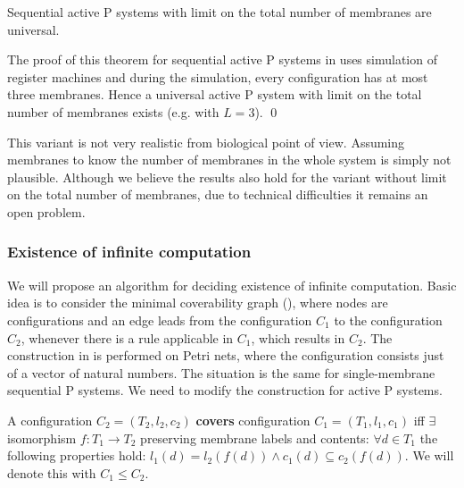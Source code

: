 \begin{veta}
  Sequential active P systems with limit on the total number of membranes are universal.
\end{veta}

\begin{dokaz}
  The proof of this theorem for sequential active P systems in \cite{Ibarra05Active} uses simulation of register machines and during the simulation, every configuration has at most three membranes. Hence a universal active P system with limit on the total number of membranes exists (e.g. with $L=3$).
  \qed
\end{dokaz}

This variant is not very realistic from biological point of view. Assuming membranes to know the number of membranes in the whole system is simply not plausible. Although we believe the results also hold for the variant without limit on the total number of membranes, due to technical difficulties it remains an open problem.

\subsubsection{Existence of infinite computation} %
\label{ssub:existence_of_infinite_computation}

We will propose an algorithm for deciding existence of infinite computation. Basic idea is to consider the minimal coverability graph (\cite{Rozenberg93MinimalCoverabilityGraph}), where nodes are configurations and an edge leads from the configuration $C_1$ to the configuration $C_2$, whenever there is a rule applicable in $C_1$, which results in $C_2$. The construction in \cite{Rozenberg93MinimalCoverabilityGraph} is performed on Petri nets, where the configuration consists just of a vector of natural numbers. The situation is the same for single-membrane sequential P systems. We need to modify the construction for active P systems.

\begin{definition}
  A configuration $C_2 = (T_2, l_2, c_2)$ {\bf covers} configuration $C_1 = (T_1, l_1, c_1)$ iff $\exists$ isomorphism $f: T_1\rightarrow T_2$ preserving membrane labels and contents: $\forall d\in T_1$ the following properties hold: $l_1(d)=l_2(f(d))\wedge c_1(d)\subseteq c_2(f(d))$. We will denote this with $C_1\leq C_2$.
\end{definition}

